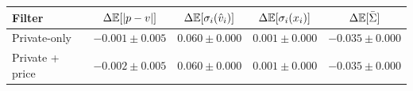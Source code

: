 \begin{tabular}{lcccc}
\hline
Filter & $\Delta\mathbb{E}[|p-v|]$ & $\Delta\mathbb{E}[\sigma_i(\hat v_i)]$ & $\Delta\mathbb{E}[\sigma_i(x_i)]$ & $\Delta\mathbb{E}[\bar\Sigma]$ \\
\hline
Private-only & $-0.001\pm0.005$ & $0.060\pm0.000$ & $0.001\pm0.000$ & $-0.035\pm0.000$ \\
Private + price & $-0.002\pm0.005$ & $0.060\pm0.000$ & $0.001\pm0.000$ & $-0.035\pm0.000$ \\
\hline
\end{tabular}
